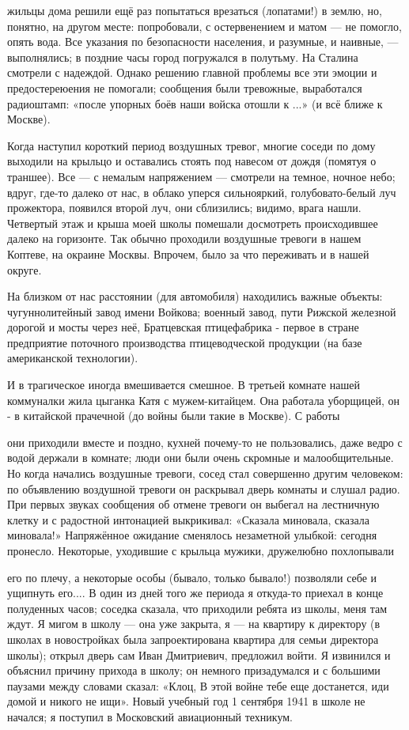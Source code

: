 \label{206-1}
жильцы дома решили ещё раз попытаться врезаться (лопатами!) в землю, но, понятно, на другом месте: попробовали, с остервенением и матом — не помогло, опять вода. Все указания по безопасности населения, и разумные, и наивные, — выполнялись; в поздние часы город погружался в полутьму. На Сталина смотрели с надеждой.
Однако решению главной проблемы все эти эмоции и предостереюения не помогали; сообщения были тревожные, выработался радиоштамп: «после упорных боёв наши войска отошли к ...» (и всё ближе к Москве).

\label{207-1}
Когда наступил короткий период воздушных тревог, многие соседи по дому выходили на крыльцо и оставались стоять под навесом от дождя (помятуя о траншее). Все — с немалым напряжением — смотрели на темное, ночное небо; вдруг, где-то далеко от нас, в облако уперся сильнояркий, голубовато-белый луч прожектора, появился второй луч, они сблизились; видимо, врага нашли. Четвертый этаж и крыша моей школы помешали досмотреть происходившее далеко на горизонте. Так обычно проходили воздушные тревоги в нашем Коптеве, на окраине Москвы. Впрочем, было за что переживать и в нашей округе.

\label{208-1}
На близком от нас расстоянии (для автомобиля) находились важные объекты: чугуннолитейный завод имени Войкова; военный завод, пути Рижской железной дорогой и мосты через неё, Братцевская птицефабрика - первое в стране предприятие поточного производства птицеводческой продукции (на базе американской технологии).

И в трагическое иногда вмешивается смешное. В третьей комнате нашей коммуналки жила цыганка Катя с мужем-китайцем. Она работала уборщицей, он - в китайской прачечной (до войны были такие в Москве). С работы

\label{209-1}
они приходили вместе и поздно, кухней почему-то не пользовались, даже ведро с водой держали в комнате; люди они были очень скромные и малообщительные. Но когда начались воздушные тревоги, сосед стал совершенно другим человеком: по объявлению воздушной тревоги он раскрывал дверь комнаты и слушал радио. При первых звуках сообщения об отмене тревоги он выбегал на лестничную клетку и с радостной интонацией выкрикивал: «Сказала миновала, сказала миновала!» Напряжённое ожидание сменялось незаметной улыбкой: сегодня пронесло. Некоторые, уходившие с крыльца мужики, дружелюбно похлопывали

\label{210-1}
его по плечу, а некоторые особы (бывало, только бывало!) позволяли себе и ущипнуть его.... В один из дней того же периода я откуда-то приехал в конце полуденных часов; соседка сказала, что приходили ребята из школы, меня там ждут. Я мигом в школу — она уже закрыта, я — на квартиру к директору (в школах в новостройках была запроектирована квартира для семьи директора школы); открыл дверь сам Иван Дмитриевич, предложил войти. Я извинился и объяснил причину прихода в школу; он немного призадумался и с большими паузами между словами сказал: «Клоц, В этой войне тебе еще достанется, иди домой и никого не ищи». Новый учебный год 1 сентября 1941 в школе не начался; я поступил в Московский авиационный техникум.
